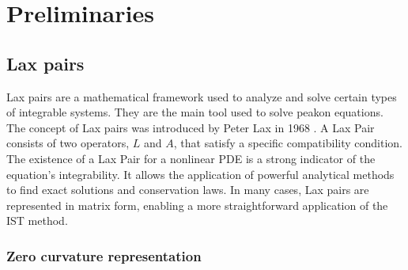 \documentclass[english,master]{liumaiex}
\theoremstyle{plain}
\theoremstyle{definition}
\begin{document}
\section{Preliminaries}

\subsection{Lax pairs}

Lax pairs are a mathematical framework used to analyze and solve certain types of integrable systems. They are the main tool used to solve peakon equations. The concept of Lax pairs was introduced by Peter Lax in 1968 \cite{Lax_1968}. A Lax Pair consists of two operators, $L$ and $A$, that satisfy a specific compatibility condition. The existence of a Lax Pair for a nonlinear PDE is a strong indicator of the equation's integrability. It allows the application of powerful analytical methods to find exact solutions and conservation laws. In many cases, Lax pairs are represented in matrix form, enabling a more straightforward application of the IST method.

\subsubsection*{Zero curvature representation}
\end{document}
